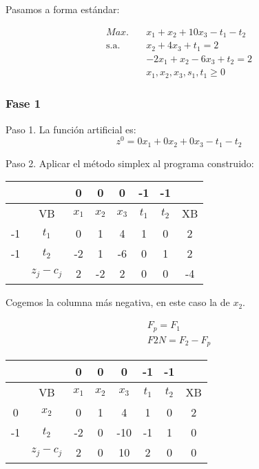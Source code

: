 \begin{itemize}
    Pasamos a forma estándar:

    \begin{align*}
        Max. \quad & x_1 + x_2 + 10x_3 - t_1 -t_2\\
        \text{s.a.} \quad & x_2 + 4x_3 + t_1= 2 \\
        & -2x_1 + x_2 - 6x_3 + t_2 = 2 \\
        & x_1, x_2, x_3, s_1, t_1 \geq 0
    \end{align*}

    \subsubsection*{Fase 1}

    Paso 1. La función artificial es: 
    \begin{equation*}
        z^0=0x_1 + 0x_2 + 0x_3  -t_1 -t_2
    \end{equation*}

    Paso 2. Aplicar el método simplex al programa construido:

    \begin{table}[H]
        \centering
        \begin{tabular}{|c|c|c|c|c|c|c|c|}
        \hline
        &  & 0 & 0 & 0 & -1 & -1 &\\
        \hline
        & VB & $x_1$ & $x_2$ & $x_3$ & $t_1$ & $t_2$ & XB \\
        \hline
        -1 & $t_1$ & 0 & 1 & 4 & 1 & 0 & 2\\
        \hline
        -1 & $t_2$ & -2 & 1 & -6 & 0& 1 &2\\
        \hline
        & $z_j - c_j$ & 2 & -2& 2 & 0 & 0 &-4\\
        \hline
        \end{tabular}
    \end{table}

    Cogemos la columna más negativa, en este caso la de $x_2$.

    \begin{align*}
        F_p = F_1\\
        F2N = F_2 - F_p
    \end{align*}

    \begin{table}[H]
        \centering
        \begin{tabular}{|c|c|c|c|c|c|c|c|}
        \hline
        &  & 0 & 0 & 0 & -1 & -1 &\\
        \hline
        & VB & $x_1$ & $x_2$ & $x_3$ & $t_1$ & $t_2$ & XB \\
        \hline
        0 & $x_2$ & 0 & 1 & 4 & 1 & 0 & 2\\
        \hline
        -1 & $t_2$ & -2 & 0 & -10 & -1& 1 &0\\
        \hline
        & $z_j - c_j$ & 2 & 0& 10 & 2 & 0 &0\\
        \hline
        \end{tabular}
    \end{table}


\end{itemize}
